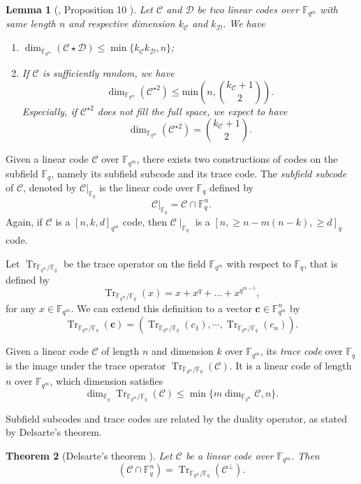 \documentclass[a4paper]{article}
\newtheorem{thm}{Theorem}[section]
\newtheorem{lemma}[thm]{Lemma}
\theoremstyle{definition}
\theoremstyle{remark}
\newcommand{\calC}{\mathcal{C}}
\newcommand{\calD}{\mathcal{D}}
\newcommand{\fqm}{\mathbb{F}_{q^m}}
\newcommand{\fq}{\mathbb{F}_{q}}
\newcommand{\Tr}[1]{\operatorname{Tr}_{\mathbb{F}_{q^m}/\fq}\left(#1\right)}
\begin{document}
\begin{lemma}[\cite{MT21}, Proposition 10 ] \label{lem:known_bounds}
Let $\calC$ and $\calD$ be two linear codes over $\fqm$ with same length $n$ and respective dimension $k_{\calC}$ and $k_{\calD}$. We have
\begin{enumerate}
	\item $\dim_{\fqm}(\calC \star \calD) \leq \min\{k_{\calC}k_{\calD},n\}$;
	\item If $\calC$ is sufficiently random, we have
\[ \dim_{\mathbb{F}_{q^m}}(\calC^{\star2}) \leq \mathrm{min}\left(n,\binom{k_{\calC}+1}{2}\right) . \]
Especially, if $\calC^{\star2}$ does not fill the full space, we expect to have 
	\[ \dim_{\fqm}(\calC^{\star2}) = \binom{k_{\calC}+1}{2}.\]
	\end{enumerate}
\end{lemma}

Given a linear code $\calC$ over $\fqm$, there exists two constructions of codes on the subfield $\fq$, namely its subfield subcode and its trace code. The \emph{subfield subcode} of $\calC$, denoted by $\calC|_{\fq}$ is the linear code over $\fq$ defined by 
\[\calC|_{\fq}=\calC \cap \mathbb{F}_q^n.\]
Again, if $\calC$ is a $[n,k,d]_{q^m}$ code, then $\calC\mid_{\fq}$ is a $[n,\geq n-m(n-k),\geq d]_q$ code.

Let $\operatorname{Tr}_{\mathbb{F}_{q^m}/\fq}$ be the trace operator on the field $\mathbb{F}_{q^m}$ with respect to $\mathbb{F}_q$, that is defined by
\[\Tr{x} = x + x^q + ... + x^{q^{m-1}},\]
for any $x \in \fqm$. We can extend this definition to a vector $\mathbf{c} \in \fqm^n$ by $$\Tr{\mathbf{c}}= (\Tr{c_1},\cdots,\Tr{c_n}).$$ 

\noindent Given a linear code $\calC$ of length $n$ and dimension $k$ over $\fqm$, its \emph{trace code} over $\fq$ is the image under the trace operator $\Tr{\calC}$. It is a linear code of length $n$ over $\fqm$, which dimension satisfies
\begin{equation}\label{eq:dim_trace}
\dim_{\mathbb{F}_q} \Tr{\calC} \leq \min\{m\dim_{\fqm} \calC,n\}.
\end{equation}

Subfield subcodes and trace codes are related by the duality operator, as stated by Delsarte's theorem.

\begin{thm}[Delsarte's theorem \cite{Del75}] \label{th:delsarte}
Let $\calC$ be a linear code over $\fqm$. Then
\[\left(\calC \cap \fq^n\right) = \Tr{\calC^{\perp}}.\]
\end{thm}
\end{document}
